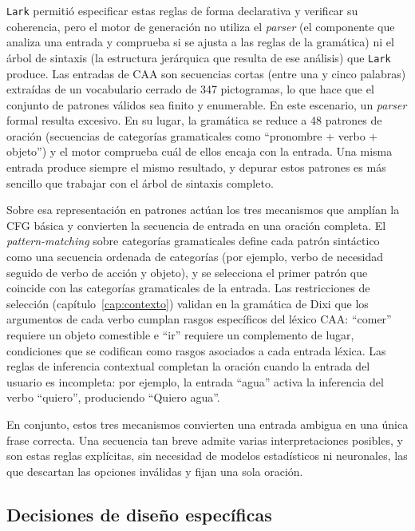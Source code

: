 \texttt{Lark} permitió especificar estas reglas de forma declarativa y verificar su coherencia, pero el motor de generación no utiliza el \textit{parser} (el componente que analiza una entrada y comprueba si se ajusta a las reglas de la gramática) ni el árbol de sintaxis (la estructura jerárquica que resulta de ese análisis) que \texttt{Lark} produce. Las entradas de CAA son secuencias cortas (entre una y cinco palabras) extraídas de un vocabulario cerrado de 347 pictogramas, lo que hace que el conjunto de patrones válidos sea finito y enumerable. En este escenario, un \textit{parser} formal resulta excesivo. En su lugar, la gramática se reduce a 48 patrones de oración (secuencias de categorías gramaticales como ``pronombre + verbo + objeto'') y el motor comprueba cuál de ellos encaja con la entrada. Una misma entrada produce siempre el mismo resultado, y depurar estos patrones es más sencillo que trabajar con el árbol de sintaxis completo.

Sobre esa representación en patrones actúan los tres mecanismos que amplían la CFG básica y convierten la secuencia de entrada en una oración completa. El \textit{pattern-matching} sobre categorías gramaticales define cada patrón sintáctico como una secuencia ordenada de categorías (por ejemplo, verbo de necesidad seguido de verbo de acción y objeto), y se selecciona el primer patrón que coincide con las categorías gramaticales de la entrada. Las restricciones de selección (capítulo~\ref{cap:contexto}) validan en la gramática de Dixi que los argumentos de cada verbo cumplan rasgos específicos del léxico CAA: ``comer'' requiere un objeto comestible e ``ir'' requiere un complemento de lugar, condiciones que se codifican como rasgos asociados a cada entrada léxica. Las reglas de inferencia contextual completan la oración cuando la entrada del usuario es incompleta: por ejemplo, la entrada ``agua'' activa la inferencia del verbo ``quiero'', produciendo ``Quiero agua''.

En conjunto, estos tres mecanismos convierten una entrada ambigua en una única frase correcta. Una secuencia tan breve admite varias interpretaciones posibles, y son estas reglas explícitas, sin necesidad de modelos estadísticos ni neuronales, las que descartan las opciones inválidas y fijan una sola oración.

\subsection{Decisiones de diseño específicas}
\label{sec:f1-postprocesamiento}

